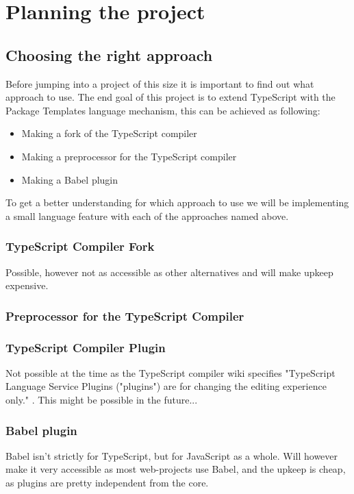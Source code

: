 
\chapter{Planning the project}\label{ch:planning-the-project}

\section{Choosing the right approach}\label{sec:choosing-the-right-approach}

Before jumping into a project of this size it is important to find out what approach to use.
The end goal of this project is to extend TypeScript with the Package Templates language mechanism,
this can be achieved as following:

\begin{itemize}
    \item Making a fork of the TypeScript compiler
    \item Making a preprocessor for the TypeScript compiler
    \item Making a Babel plugin
\end{itemize}

To get a better understanding for which approach to use we will be implementing a small language feature with each of the approaches named above.



\subsection{TypeScript Compiler Fork}

Possible, however not as accessible as other alternatives and will make upkeep expensive.

\subsection{Preprocessor for the TypeScript Compiler}

\subsection{TypeScript Compiler Plugin}

Not possible at the time as the TypeScript compiler wiki specifies "TypeScript Language Service Plugins ("plugins") are for changing the editing experience only." \cite{tscplugin}. This might be possible in the future...


\subsection{Babel plugin}

Babel isn't strictly for TypeScript, but for JavaScript as a whole. Will however make it very accessible as most web-projects use Babel, and the upkeep is cheap, as plugins are pretty independent from the core.
